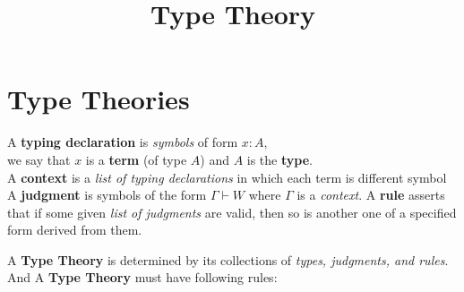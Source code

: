 


    \title{Type Theory}
    \author{{\color{pink}{Cloudi}}{\color{Aquamarine}{fold}}}
    \maketitle
    \newpage

    \setcounter{section}{-1}

    \section{Type Theories}

    \begin{defn}
        A \textbf{typing declaration} is \textit{symbols} of form $x : A$,\\
        we say that $x$ is a \textbf{term} (of type $A$) and $A$ is the \textbf{type}.\\
        A \textbf{context} is a \textit{list of typing declarations} in which each term is different symbol\\
        A \textbf{judgment} is symbols of the form $\Gamma \vdash W$ where $\Gamma$ is a \textit{context}.
        A \textbf{rule} asserts that if some given \textit{list of judgments} are valid,
        then so is another one of a specified form derived from them. 
    \end{defn}
    
    \begin{defn}
        A \textbf{Type Theory} is determined by its collections of \textit{types, judgments, and rules}.\\
        And A \textbf{Type Theory} must have following rules:\\
    \end{defn}



    

    \vspace*{0.9cm}
    

